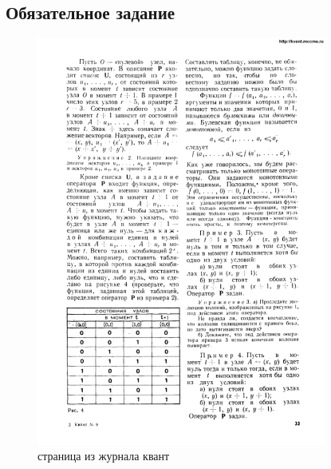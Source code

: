 \documentclass[a4paper]{article}
\begin{document}
		\subsection{Обязательное задание}
		\begin{figure}[h]
			\centering
			\includegraphics[width=0.85\textwidth]{Kvant.png}
			\caption{страница из журнала квант}
			\label{fig:квант}
		\end{figure}
	\newpage
\end{document}
